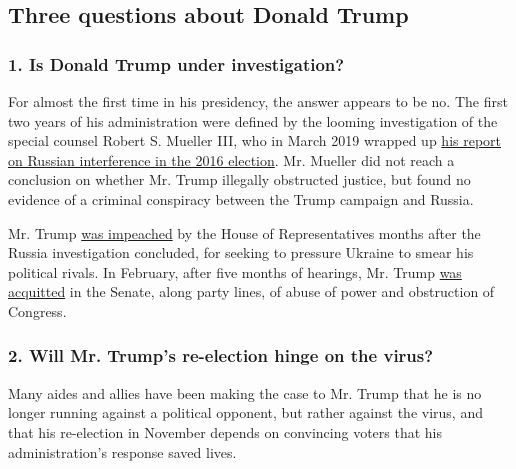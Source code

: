 \hypertarget{three-questions-about-donald-trump}{%
\subsection{Three questions about Donald
Trump}\label{three-questions-about-donald-trump}}

\hypertarget{1-is-donald-trump-under-investigation}{%
\subsubsection{\texorpdfstring{\textbf{1. Is Donald Trump under
investigation?}}{1. Is Donald Trump under investigation?}}\label{1-is-donald-trump-under-investigation}}

For almost the first time in his presidency, the answer appears to be
no. The first two years of his administration were defined by the
looming investigation of the special counsel Robert S. Mueller III, who
in March 2019 wrapped up
\href{https://www.nytimes3xbfgragh.onion/2019/03/24/us/politics/mueller-report-summary.html}{his
report on Russian interference in the 2016 election}. Mr. Mueller did
not reach a conclusion on whether Mr. Trump illegally obstructed
justice, but found no evidence of a criminal conspiracy between the
Trump campaign and Russia.

Mr. Trump
\href{https://www.nytimes3xbfgragh.onion/2019/12/18/us/politics/trump-impeached.html}{was
impeached} by the House of Representatives months after the Russia
investigation concluded, for seeking to pressure Ukraine to smear his
political rivals. In February, after five months of hearings, Mr. Trump
\href{https://www.nytimes3xbfgragh.onion/2020/02/05/us/politics/trump-acquitted-impeachment.html}{was
acquitted} in the Senate, along party lines, of abuse of power and
obstruction of Congress.

\hypertarget{2-will-mr-trumps-re-election-hinge-on-the-virus}{%
\subsubsection{\texorpdfstring{\textbf{2. Will Mr. Trump's re-election
hinge on the
virus?}}{2. Will Mr. Trump's re-election hinge on the virus?}}\label{2-will-mr-trumps-re-election-hinge-on-the-virus}}

Many aides and allies have been making the case to Mr. Trump that he is
no longer running against a political opponent, but rather against the
virus, and that his re-election in November depends on convincing voters
that his administration's response saved lives.

